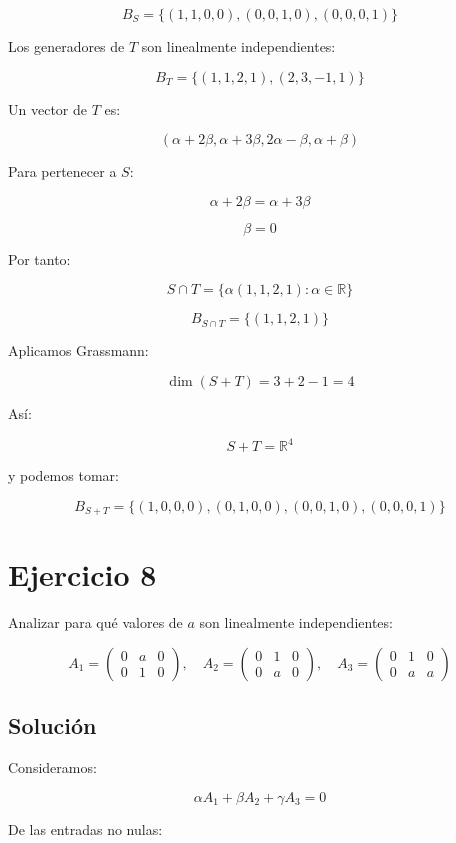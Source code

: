 \documentclass[11pt,a4paper]{article}
\newcommand{\R}{\mathbb{R}}
\newcommand{\dimn}{\operatorname{dim}}
\begin{document}
	\[
	\boxed{
	B_S=
	\{(1,1,0,0),(0,0,1,0),(0,0,0,1)\}
	}
	\]

	Los generadores de $T$ son linealmente independientes:

	\[
	\boxed{
	B_T=
	\{(1,1,2,1),(2,3,-1,1)\}
	}
	\]

	Un vector de $T$ es:

	\[
	(\alpha+2\beta,\alpha+3\beta,2\alpha-\beta,\alpha+\beta)
	\]

	Para pertenecer a $S$:

	\[
	\alpha+2\beta
	=
	\alpha+3\beta
	\]

	\[
	\beta=0
	\]

	Por tanto:

	\[
	S\cap T
	=
	\{\alpha(1,1,2,1):\alpha\in\R\}
	\]

	\[
	\boxed{
	B_{S\cap T}
	=
	\{(1,1,2,1)\}
	}
	\]

	Aplicamos Grassmann:

	\[
	\dimn(S+T)
	=
	3+2-1
	=
	4
	\]

	Así:

	\[
	S+T=\R^4
	\]

	y podemos tomar:

	\[
	\boxed{
	B_{S+T}
	=
	\{(1,0,0,0),(0,1,0,0),(0,0,1,0),(0,0,0,1)\}
	}
	\]

\section{Ejercicio 8}
	Analizar para qué valores de $a$ son linealmente independientes:

	\[
	A_1=
	\begin{pmatrix}
	0&a&0\\
	0&1&0
	\end{pmatrix},
	\quad
	A_2=
	\begin{pmatrix}
	0&1&0\\
	0&a&0
	\end{pmatrix},
	\quad
	A_3=
	\begin{pmatrix}
	0&1&0\\
	0&a&a
	\end{pmatrix}
	\]

	\subsection{Solución}

	Consideramos:

	\[
	\alpha A_1+\beta A_2+\gamma A_3=0
	\]

	De las entradas no nulas:
\end{document}

